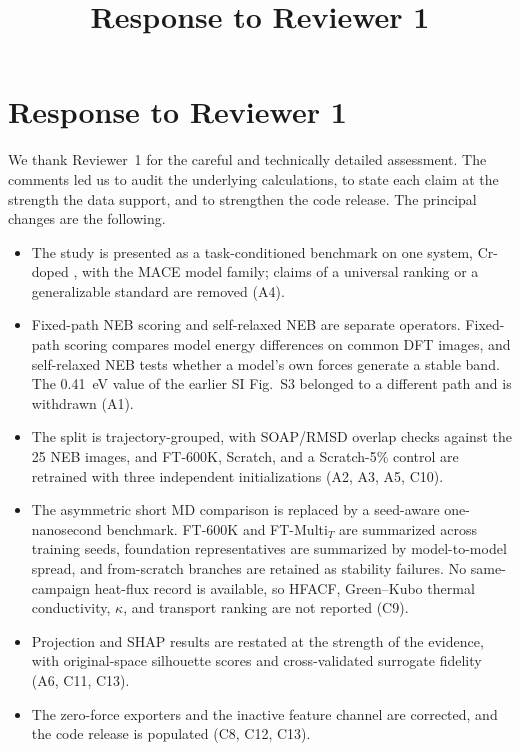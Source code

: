 \documentclass[11pt,a4paper]{article}
\title{\textbf{Response to Reviewer 1}}
\author{}
\date{}
\begin{document}
\maketitle
\thispagestyle{fancy}

\section*{Response to Reviewer 1}

We thank Reviewer~1 for the careful and technically detailed assessment. The comments led us to audit the underlying calculations, to state each claim at the strength the data support, and to strengthen the code release. The principal changes are the following.

\begin{itemize}
    \item The study is presented as a task-conditioned benchmark on one system, Cr-doped , with the MACE model family; claims of a universal ranking or a generalizable standard are removed (A4).
    \item Fixed-path NEB scoring and self-relaxed NEB are separate operators. Fixed-path scoring compares model energy differences on common DFT images, and self-relaxed NEB tests whether a model's own forces generate a stable band. The 0.41~eV value of the earlier SI Fig.~S3 belonged to a different path and is withdrawn (A1).
    \item The split is trajectory-grouped, with SOAP/RMSD overlap checks against the 25 NEB images, and FT-600K, Scratch, and a Scratch-5\% control are retrained with three independent initializations (A2, A3, A5, C10).
    \item The asymmetric short MD comparison is replaced by a seed-aware one-nanosecond benchmark. FT-600K and FT-Multi$_T$ are summarized across training seeds, foundation representatives are summarized by model-to-model spread, and from-scratch branches are retained as stability failures. No same-campaign heat-flux record is available, so HFACF, Green--Kubo thermal conductivity, $\kappa$, and transport ranking are not reported (C9).
    \item Projection and SHAP results are restated at the strength of the evidence, with original-space silhouette scores and cross-validated surrogate fidelity (A6, C11, C13).
    \item The zero-force exporters and the inactive feature channel are corrected, and the code release is populated (C8, C12, C13).
\end{itemize}
\end{document}
